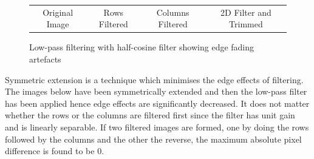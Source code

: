 \documentclass{article}					%
\begin{document}
\begin{figure}[ht!]
\begin{centering}
\begin{tabular}{c c c c}
  Original Image & Rows Filtered & Columns Filtered & 2D Filter and Trimmed\\
\end{tabular}
\caption{Low-pass filtering with half-cosine filter showing edge fading artefacts}
\end{centering}
\end{figure}

Symmetric extension is a technique which minimises the edge effects of filtering. The images below have been symmetrically extended and then the low-pass filter has been applied hence edge effects are significantly decreased. It does not matter whether the rows or the columns are filtered first since the filter has unit gain and is linearly separable. If two filtered images are formed, one by doing the rows followed by the columns and the other the reverse, the maximum absolute pixel difference is found to be 0.
\end{document}
